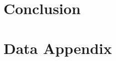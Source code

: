 \documentclass{article}
\theoremstyle{definition}
\theoremstyle{definition}
\theoremstyle{definition}
\begin{document}
\section{Conclusion} \label{conc} 













\pagebreak







\appendix
\captionsetup{labelformat=AppendixTables}


\setcounter{figure}{0}   
\setcounter{table}{0}   

\renewcommand{\thetable}{\arabic{table}}
\renewcommand{\thefigure}{\arabic{figure}}



\section{Data Appendix} \label{data_app}
\end{document}
